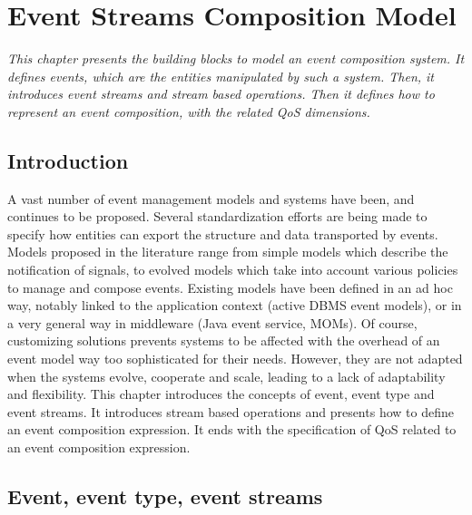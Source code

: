 \chapter{Event Streams Composition Model}
\label{ch3}
\textit{This chapter presents the building blocks to model an event composition system. It defines events, which are the entities manipulated by such a system. Then, it introduces event 
streams and stream based operations. Then it defines how to represent an event composition, with the related QoS dimensions.}
\vspace{5cm}
\vspace{2ex}\vfill
\minitoc

\section{Introduction}
 \label{ch3:intro}
A vast number of event management models and systems have been, and continues to be proposed. Several standardization efforts are being made to specify how entities can export the structure and data transported by events. Models proposed in the literature range from simple models which describe the notification of signals, to evolved models which take into account various policies to manage and compose events. 
Existing models have been defined in an ad hoc way, notably linked to the application context (active DBMS event models), or in a very general way in middleware (Java event service, MOMs). Of course, customizing solutions prevents systems to be affected with the overhead of an event model way too sophisticated for their needs. However, they are not adapted when the systems evolve, cooperate and scale, leading to a lack of adaptability and flexibility. 
This chapter introduces the concepts of event, event type and event streams. It introduces stream based operations and presents how to define an event composition expression. It ends with the specification of QoS related to an event composition expression.  

\section{Event, event type, event streams}
\label{ch3:sec2}

